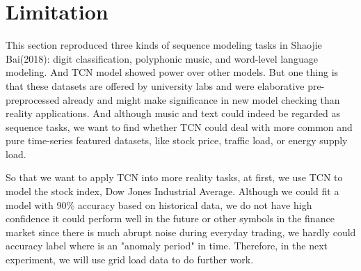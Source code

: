 \section{Limitation}
This section reproduced three kinds of sequence modeling tasks in Shaojie Bai(2018): digit classification, polyphonic music, and word-level language modeling. And TCN model showed power over other models. But one thing is that these datasets are offered by university labs and were elaborative pre-preprocessed already and might make significance in new model checking than reality applications. And although music and text could indeed be regarded as sequence tasks, we want to find whether TCN could deal with more common and pure time-series featured datasets, like stock price, traffic load, or energy supply load. 

So that we want to apply TCN into more reality tasks, at first, we use TCN to model the stock index, Dow Jones Industrial Average. Although we could fit a model with 90\% accuracy based on historical data, we do not have high confidence it could perform well in the future or other symbols in the finance market since there is much abrupt noise during everyday trading, we hardly could accuracy label where is an "anomaly period" in time. Therefore, in the next experiment, we will use grid load data to do further work.
